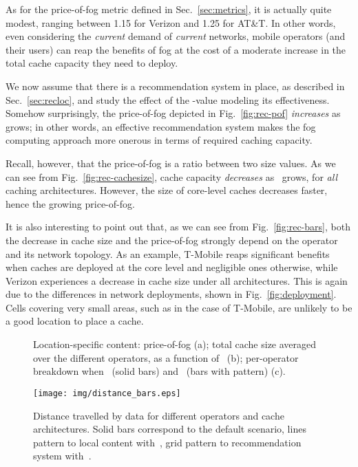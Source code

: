 \documentclass{sig-alternate-05-2015}
\newcommand{\Fig}[1]{Fig.~\ref{fig:#1}}
\newcommand{\Sec}[1]{Sec.~\ref{sec:#1}}
\begin{document}
As for the price-of-fog metric defined in \Sec{metrics}, it is actually quite modest, ranging between 1.15 for Verizon and 1.25 for AT\&T. In other words, even considering the {\em current} demand of {\em current} networks, mobile operators (and their users) can reap the benefits of fog at the cost of a moderate increase in the total cache capacity they need to deploy.

We now assume that there is a recommendation system in place, as described in \Sec{recloc}, and study the effect of the -value modeling its effectiveness. Somehow surprisingly, the price-of-fog depicted in \Fig{rec-pof} {\em increases} as~ grows; in other words, an effective recommendation system makes the fog computing approach more onerous in terms of required caching capacity.

Recall, however, that the price-of-fog is a ratio between two size values. As we can see from \Fig{rec-cachesize}, cache capacity {\em decreases} as~ grows, for {\em all} caching architectures. However, the size of core-level caches decreases faster, hence the growing price-of-fog.

It is also interesting to point out that, as we can see from \Fig{rec-bars}, both the decrease in cache size and the price-of-fog strongly depend on the operator and its network topology. As an example, T-Mobile reaps significant benefits when caches are deployed at the core level and negligible ones otherwise, while Verizon experiences a decrease in cache size under all architectures.
This is again due to the differences in network deployments, shown in \Fig{deployment}. Cells covering very small areas, such as in the case of T-Mobile, are unlikely to be a good location to place a cache.

\begin{figure*}[]
\centering
{}   \caption{Location-specific content: price-of-fog (a); total cache size averaged
over the different operators, as a function of~ (b); per-operator breakdown when~ (solid bars) and~ (bars with pattern) (c).
\vspace*{-3mm}
} \end{figure*}

\begin{figure}[]
\centering
\texttt{[image: img/distance\_bars.eps]}
\caption{
Distance travelled by data for different operators and cache architectures. Solid bars correspond to the default scenario, lines pattern to local content with~, grid pattern to recommendation system with~.
\label{fig:distance}
\vspace{-6mm}
} \end{figure}
\end{document}
